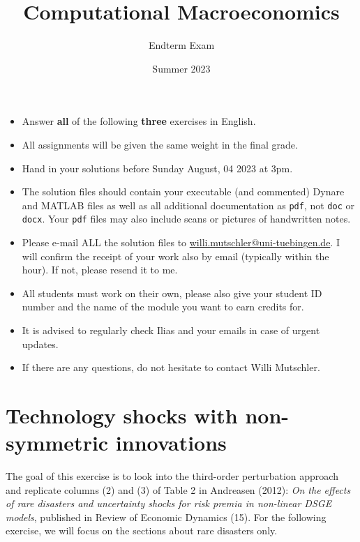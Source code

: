 \documentclass{article}
\begin{document}
	
\title{Computational Macroeconomics}
\author{Endterm Exam}
\date{Summer 2023}
\maketitle


\begin{itemize}
\item
Answer \textbf{all} of the following \textbf{three} exercises in English.
\item
All assignments will be given the same weight in the final grade.
\item
Hand in your solutions before Sunday August, 04 2023 at 3pm.
\item
The solution files should contain your executable (and commented) Dynare and MATLAB files
  as well as all additional documentation as \texttt{pdf}, not \texttt{doc} or \texttt{docx}.
Your \texttt{pdf} files may also include scans or pictures of handwritten notes.
\item
Please e-mail ALL the solution files to \url{willi.mutschler@uni-tuebingen.de}.
I will confirm the receipt of your work also by email (typically within the hour). If not, please resend it to me.
\item
All students must work on their own, please also give your student ID number and the name of the module you want to earn credits for.
\item
It is advised to regularly check Ilias and your emails in case of urgent updates.
\item
If there are any questions, do not hesitate to contact Willi Mutschler.
\end{itemize}

\newpage

\section[Technology shocks with non-symmetric innovations]{Technology shocks with non-symmetric innovations\label{ex:Andreasen_2012}}
The goal of this exercise is to look into the third-order perturbation approach and replicate columns (2) and (3) of Table 2 in Andreasen (2012):
  \emph{On the effects of rare disasters and uncertainty shocks for risk premia in non-linear DSGE models},
  published in Review of Economic Dynamics (15).
For the following exercise, we will focus on the sections about rare disasters only.
\end{document}
